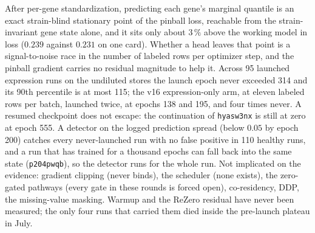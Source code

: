  After per-gene
standardization, predicting each gene's marginal quantile is an exact strain-blind stationary
point of the pinball loss, reachable from the strain-invariant gene state alone, and it sits
only about $3\,\%$ above the working model in loss ($0.239$ against $0.231$ on one card).
Whether a head leaves that point is a signal-to-noise race in the number of labeled rows per
optimizer step, and the pinball gradient carries no residual magnitude to help it. Across 95
launched expression runs on the undiluted stores the launch epoch never exceeded 314 and its
90th percentile is at most 115; the v16 expression-only arm, at eleven labeled rows per batch,
launched twice, at epochs 138 and 195, and four times never. A resumed checkpoint does not
escape: the continuation of \texttt{hyasw3nx} is still at zero at epoch 555. A detector on the
logged prediction spread (below $0.05$ by epoch 200) catches every never-launched run with no
false positive in 110 healthy runs, and a run that has trained for a thousand epochs can fall
back into the same state (\texttt{p204pwqb}), so the detector runs for the whole run. Not
implicated on the evidence: gradient clipping (never binds), the scheduler (none exists), the
zero-gated pathways (every gate in these rounds is forced open), co-residency, DDP, the
missing-value masking. Warmup and the ReZero residual have never been measured; the only four
runs that carried them died inside the pre-launch plateau in July.

